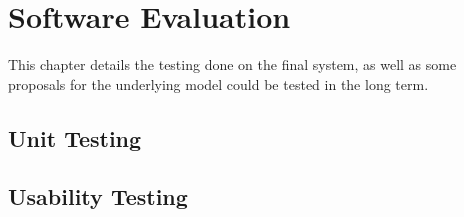 \chapter{Software Evaluation}
\label{chapter:software_evaluation}
  This chapter details the testing done on the final system, as well as some proposals for the underlying model could be tested in the long term.

  \section{Unit Testing}
  \section{Usability Testing}
